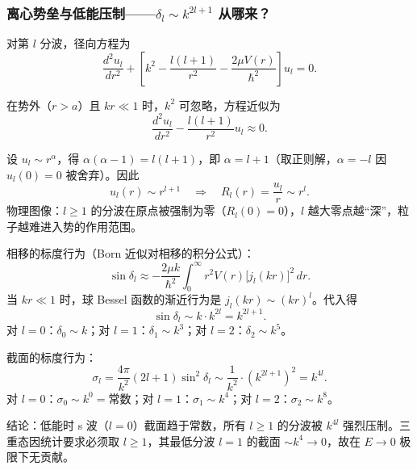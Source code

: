 \begin{derivationbox}[离心势垒与低能压制]
\subsubsection*{离心势垒与低能压制——$\delta_l \sim k^{2l+1}$ 从哪来？}

对第 $l$ 分波，径向方程为
\[
\frac{d^2 u_l}{dr^2} + \left[ k^2 - \frac{l(l+1)}{r^2} - \frac{2\mu V(r)}{\hbar^2} \right] u_l = 0.
\]

在势外（$r > a$）且 $kr \ll 1$ 时，$k^2$ 可忽略，方程近似为
\[
\frac{d^2 u_l}{dr^2} - \frac{l(l+1)}{r^2} u_l \approx 0.
\]

设 $u_l \sim r^\alpha$，得 $\alpha(\alpha - 1) = l(l+1)$，即 $\alpha = l+1$（取正则解，$\alpha = -l$ 因 $u_l(0) = 0$ 被舍弃）。因此
\[
u_l(r) \sim r^{l+1} \quad \Longrightarrow \quad R_l(r) = \frac{u_l}{r} \sim r^l.
\]
物理图像：$l \ge 1$ 的分波在原点被强制为零（$R_l(0) = 0$），$l$ 越大零点越``深''，粒子越难进入势的作用范围。

相移的标度行为（Born 近似对相移的积分公式）：
\[
\sin\delta_l \approx -\frac{2\mu k}{\hbar^2} \int_0^\infty r^2 V(r) \bigl[j_l(kr)\bigr]^2 \, dr.
\]
当 $kr \ll 1$ 时，球 Bessel 函数的渐近行为是 $j_l(kr) \sim (kr)^l$。代入得
\[
\sin\delta_l \sim k \cdot k^{2l} = k^{2l+1}.
\]
对 $l = 0$：$\delta_0 \sim k$；对 $l = 1$：$\delta_1 \sim k^3$；对 $l = 2$：$\delta_2 \sim k^5$。

截面的标度行为：
\[
\sigma_l = \frac{4\pi}{k^2}(2l+1)\sin^2\delta_l \sim \frac{1}{k^2} \cdot (k^{2l+1})^2 = k^{4l}.
\]
对 $l = 0$：$\sigma_0 \sim k^0 = \text{常数}$；对 $l = 1$：$\sigma_1 \sim k^4$；对 $l = 2$：$\sigma_2 \sim k^8$。

结论：低能时 s 波（$l = 0$）截面趋于常数，所有 $l \ge 1$ 的分波被 $k^{4l}$ 强烈压制。三重态因统计要求必须取 $l \ge 1$，其最低分波 $l = 1$ 的截面 $\sim k^4 \to 0$，故在 $E \to 0$ 极限下无贡献。
\end{derivationbox}

